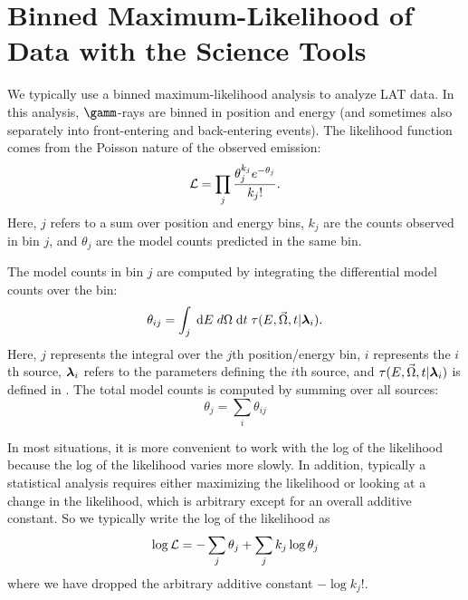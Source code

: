 \section{Binned Maximum-Likelihood of  Data with the Science Tools}

We typically use a binned maximum-likelihood analysis to analyze \ac{LAT}
data.  In this analysis, $\gamm$-rays are binned in position and energy (and
sometimes also separately into front-entering and back-entering events).
The likelihood function comes from the Poisson nature of the observed
emission:
\begin{equation}\eqnlabel{poisson_likelihood_counts_model}
  \likelihood=\prod_j \frac{\theta_j^{k_j} e^{-\theta_j}}{k_j!}.
\end{equation}
Here, $j$ refers to a sum over position and energy bins, $k_j$ are the counts
observed in bin $j$, and $\theta_j$ are the model counts predicted in
the same bin.

The model counts in bin $j$ are computed by integrating the differential
model counts over the bin:
\begin{equation}
  \theta_{ij} = \int_j \; \text{d}E \; 
  d\Omega \; \text{d}t \; 
  \tau(E,\vec\Omega,t|\boldsymbol{\lambda}_i).
\end{equation}
Here, $j$ represents the integral over the $j$th position/energy
bin, $i$ represents the $i$th source, $\boldsymbol{\lambda}_i$
refers to the parameters defining the $i$th source, and
$\tau(E,\vec\Omega,t|\boldsymbol{\lambda}_i)$ is defined in
. The total model counts is computed by summing over
all sources:
\begin{equation}
  \theta_j = \sum_i \theta_{ij}
\end{equation}

In most situations, it is more convenient to work with the log of
the likelihood because the log of the likelihood varies more slowly.
In addition, typically a statistical analysis requires either maximizing the
likelihood or looking at a change in the likelihood, which is
arbitrary except for an overall additive constant. So we typically
write the log of the likelihood as
\begin{equation}\eqnlabel{log_likelihood_sum_theta}
  \log\likelihood = -\sum_j\theta_j + \sum_j k_j\log\theta_j 
\end{equation}
where we have dropped the arbitrary additive constant $-\log k_j!$.

